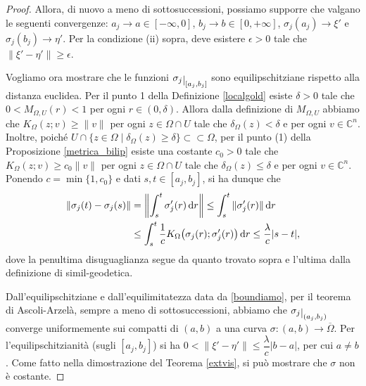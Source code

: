 \begin{proof}
    Allora, di nuovo a meno di sottosuccessioni, possiamo supporre che valgano le seguenti convergenze: $a_j\longrightarrow a\in[-\infty,0]$, $b_j\longrightarrow b\in[0,+\infty]$, $\sigma_j(a_j)\longrightarrow\xi'$ e $\sigma_j(b_j)\longrightarrow\eta'$. Per la condizione (ii) sopra, deve esistere $\epsilon>0$ tale che $\|\xi'-\eta'\|\ge\epsilon$.

    Vogliamo ora mostrare che le funzioni $\sigma_j\restrict{[a_j,b_j]}$ sono equilipschitziane rispetto alla distanza euclidea. Per il punto 1 della Definizione \ref{localgold} esiste $\delta>0$ tale che $0<M_{\Omega,U}(r)<1$ per ogni $r\in(0,\delta)$. Allora dalla definizione di $M_{\Omega,U}$ abbiamo che $K_\Omega(z;v)\ge\|v\|$ per ogni $z\in\Omega\cap U$ tale che $\delta_\Omega(z)<\delta$ e per ogni $v\in\mathbb{C}^n$. Inoltre, poiché $U\cap\{z\in\Omega\mid\delta_\Omega(z)\ge\delta\}\subset\subset\Omega$, per il punto (1) della Proposizione \ref{metrica_bilip} esiste una costante $c_0>0$ tale che $K_\Omega(z;v)\ge c_0\|v\|$ per ogni $z\in\Omega\cap U$ tale che $\delta_\Omega(z)\le\delta$ e per ogni $v\in\mathbb{C}^n$. Ponendo $c=\min\{1,c_0\}$ e dati $s,t\in[a_j,b_j]$, si ha dunque che
    \begin{align*}
        \|\sigma_j(t)-\sigma_j(s)\|&=\left\|\int_s^t \sigma_j'(r)\mathop{}\!\mathrm{d} r\right\| \le \int_s^t \|\sigma_j'(r)\|\mathop{}\!\mathrm{d} r\\
        &\le \int_s^t \frac{1}{c}K_\Omega\big(\sigma_j(r);\sigma_j'(r)\big)\mathop{}\!\mathrm{d} r\le \frac{\lambda}{c}|s-t|,
    \end{align*}
    dove la penultima disuguaglianza segue da quanto trovato sopra e l'ultima dalla definizione di simil-geodetica.

    Dall'equilipschitziane e dall'equilimitatezza data da \eqref{boundiamo}, per il teorema di Ascoli-Arzelà, sempre a meno di sottosuccessioni, abbiamo che $\sigma_j\restrict{(a_j,b_j)}$ converge uniformemente sui compatti di $(a,b)$ a una curva $\sigma:(a,b)\longrightarrow\overline{\Omega}$. Per l'equilipschitzianità (sugli $[a_j,b_j]$) si ha $0<\|\xi'-\eta'\|\le \dfrac{\lambda}{c}|b-a|$, per cui $a\not=b$. Come fatto nella dimostrazione del Teorema \ref{extvis}, si può mostrare che $\sigma$ non è costante.


\end{proof}

